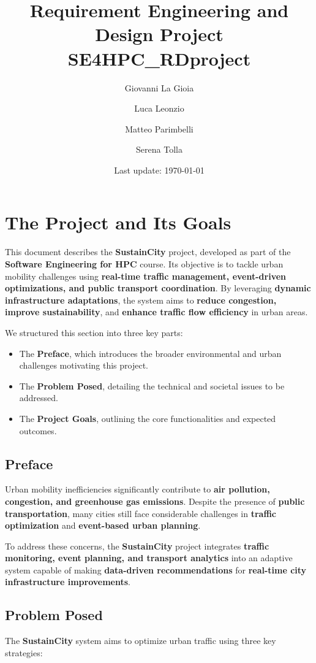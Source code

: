 \documentclass[a4paper,12pt]{article}
\title{Requirement Engineering and Design Project \\ SE4HPC_RDproject}
\author[1]{Giovanni La Gioia}
\author[2]{Luca Leonzio}
\author[3]{Matteo Parimbelli}
\author[4]{Serena Tolla}
\affil[1,2,3,4]{Politecnico di Milano}
\date{Last update: \today}
\begin{document}
\maketitle
\newpage
\tableofcontents
\clearpage
\newpage

\section{The Project and Its Goals}
This document describes the \textbf{SustainCity} project, developed as part of the \textbf{Software Engineering for HPC} course. Its objective is to tackle urban mobility challenges using \textbf{real-time traffic management, event-driven optimizations, and public transport coordination}. By leveraging \textbf{dynamic infrastructure adaptations}, the system aims to \textbf{reduce congestion, improve sustainability}, and \textbf{enhance traffic flow efficiency} in urban areas.

We structured this section into three key parts:
\begin{itemize}
    \item The \textbf{Preface}, which introduces the broader environmental and urban challenges motivating this project.
    \item The \textbf{Problem Posed}, detailing the technical and societal issues to be addressed.
    \item The \textbf{Project Goals}, outlining the core functionalities and expected outcomes.
\end{itemize}

\subsection{Preface}
Urban mobility inefficiencies significantly contribute to \textbf{air pollution, congestion, and greenhouse gas emissions}. Despite the presence of \textbf{public transportation}, many cities still face considerable challenges in \textbf{traffic optimization} and \textbf{event-based urban planning}.

To address these concerns, the \textbf{SustainCity} project integrates \textbf{traffic monitoring, event planning, and transport analytics} into an adaptive system capable of making \textbf{data-driven recommendations} for \textbf{real-time city infrastructure improvements}.

\subsection{Problem Posed}
The \textbf{SustainCity} system aims to optimize urban traffic using three key strategies:
\end{document}
